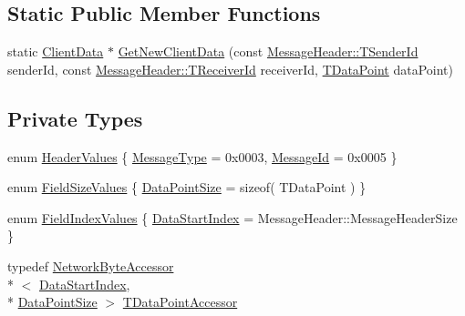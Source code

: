 \subsection*{Static Public Member Functions}
\begin{DoxyCompactItemize}
\item 
static \hyperlink{class_terra_swarm_1_1_synchronous_1_1_client_data}{Client\-Data} $\ast$ \hyperlink{class_terra_swarm_1_1_synchronous_1_1_client_data_a5b055348cbcd27e656744b51d98c1ab2}{Get\-New\-Client\-Data} (const \hyperlink{class_terra_swarm_1_1_message_header_a516b36855e2aad7cfbf8770f1b42784f}{Message\-Header\-::\-T\-Sender\-Id} sender\-Id, const \hyperlink{class_terra_swarm_1_1_message_header_aa3260702b182b6f88ddbdd3416e98df0}{Message\-Header\-::\-T\-Receiver\-Id} receiver\-Id, \hyperlink{class_terra_swarm_1_1_synchronous_1_1_client_data_a6c581f1f80217390ea8fe95136c60f07}{T\-Data\-Point} data\-Point)
\end{DoxyCompactItemize}
\subsection*{Private Types}
\begin{DoxyCompactItemize}
\item 
enum \hyperlink{class_terra_swarm_1_1_synchronous_1_1_client_data_a529711f4bde913bbc871ba784b668cb5}{Header\-Values} \{ \hyperlink{class_terra_swarm_1_1_synchronous_1_1_client_data_a529711f4bde913bbc871ba784b668cb5acfabe23548b5afe59eb4880618ebd082}{Message\-Type} = 0x0003, 
\hyperlink{class_terra_swarm_1_1_synchronous_1_1_client_data_a529711f4bde913bbc871ba784b668cb5a2025f950fc35f0a838bc4b72d5fd5e8c}{Message\-Id} = 0x0005
 \}
\item 
enum \hyperlink{class_terra_swarm_1_1_synchronous_1_1_client_data_aae90a1a7ba3ea4c66542d1c3c9f2e6d9}{Field\-Size\-Values} \{ \hyperlink{class_terra_swarm_1_1_synchronous_1_1_client_data_aae90a1a7ba3ea4c66542d1c3c9f2e6d9aca053edd8f58cbd2cb277d7cfad9a419}{Data\-Point\-Size} = sizeof( T\-Data\-Point )
 \}
\item 
enum \hyperlink{class_terra_swarm_1_1_synchronous_1_1_client_data_a46332e5dcabec8b7327933a990299886}{Field\-Index\-Values} \{ \hyperlink{class_terra_swarm_1_1_synchronous_1_1_client_data_a46332e5dcabec8b7327933a990299886a459dcd5d2d9c725f12d2b5a8175f40b7}{Data\-Start\-Index} = Message\-Header\-:\-:Message\-Header\-Size
 \}
\item 
typedef \hyperlink{class_terra_swarm_1_1_network_byte_accessor}{Network\-Byte\-Accessor}\\*
$<$ \hyperlink{class_terra_swarm_1_1_synchronous_1_1_client_data_a46332e5dcabec8b7327933a990299886a459dcd5d2d9c725f12d2b5a8175f40b7}{Data\-Start\-Index}, \\*
\hyperlink{class_terra_swarm_1_1_synchronous_1_1_client_data_aae90a1a7ba3ea4c66542d1c3c9f2e6d9aca053edd8f58cbd2cb277d7cfad9a419}{Data\-Point\-Size} $>$ \hyperlink{class_terra_swarm_1_1_synchronous_1_1_client_data_a69ba4da130856d78eec92c6dcdb61c58}{T\-Data\-Point\-Accessor}
\end{DoxyCompactItemize}
